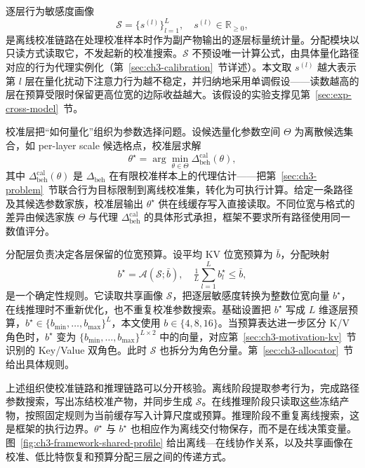 逐层行为敏感度画像
\begin{equation}
\mathcal{S}=\{s^{(l)}\}_{l=1}^{L},\quad s^{(l)}\in\mathbb{R}_{\geq 0},
\end{equation}
是离线校准链路在处理校准样本时作为副产物输出的逐层标量统计量。分配模块以只读方式读取它，不发起新的校准搜索。$\mathcal{S}$ 不预设唯一计算公式，由具体量化路径对应的行为代理实例化（第~\ref{sec:ch3-calibration}~节详述）。本文取 $s^{(l)}$ 越大表示第 $l$ 层在量化扰动下注意力行为越不稳定，并归纳地采用单调假设——读数越高的层在预算受限时保留更高位宽的边际收益越大。该假设的实验支撑见第~\ref{sec:exp-cross-model}~节。

校准层把“如何量化”组织为参数选择问题。设候选量化参数空间 $\Theta$ 为离散候选集合，如 per-layer scale 候选格点，校准层求解
\begin{equation}
\theta^\star = \arg\min_{\theta\in\Theta}\Delta_{\mathrm{beh}}^{\mathrm{cal}}(\theta),
\end{equation}
其中 $\Delta_{\mathrm{beh}}^{\mathrm{cal}}(\theta)$ 是 $\Delta_{\mathrm{beh}}$ 在有限校准样本上的代理估计——把第~\ref{sec:ch3-problem}~节联合行为目标限制到离线校准集，转化为可执行计算。给定一条路径及其候选参数家族，校准层输出 $\theta^\star$ 供在线缓存写入直接读取。不同位宽与格式的差异由候选家族 $\Theta$ 与代理 $\Delta_{\mathrm{beh}}^{\mathrm{cal}}$ 的具体形式承担，框架不要求所有路径使用同一数值评分。

分配层负责决定各层保留的位宽预算。设平均 KV 位宽预算为 $\bar b$，分配映射
\begin{equation}
b^\star = \mathcal{A}(\mathcal{S};\bar b),\quad \tfrac{1}{L}\sum_{l=1}^{L} b^\star_l \le \bar b,
\end{equation}
是一个确定性规则。它读取共享画像 $\mathcal{S}$，把逐层敏感度转换为整数位宽向量 $b^\star$，在线推理时不重新优化，也不重复校准参数搜索。基础设置把 $b^\star$ 写成 $L$ 维逐层预算，$b^\star\in\{b_{\min},\dots,b_{\max}\}^L$，本文使用 $b\in\{4,8,16\}$。当预算表达进一步区分 K/V 角色时，$b^\star$ 变为 $\{b_{\min},\dots,b_{\max}\}^{L\times 2}$ 中的向量，对应第~\ref{sec:ch3-motivation-kv}~节识别的 Key/Value 双角色。此时 $\mathcal{S}$ 也拆分为角色分量。第~\ref{sec:ch3-allocator}~节给出具体规则。

上述组织使校准链路和推理链路可以分开核验。离线阶段提取参考行为，完成路径参数搜索，写出冻结校准产物，并同步生成 $\mathcal{S}$。在线推理阶段只读取这些冻结产物，按照固定规则为当前缓存写入计算尺度或预算。推理阶段不重复离线搜索，这是框架的执行边界。$\theta^\star$ 与 $b^\star$ 也相应作为离线交付物保存，而不是在线决策变量。图~\ref{fig:ch3-framework-shared-profile} 给出离线—在线协作关系，以及共享画像在校准、低比特恢复和预算分配三层之间的传递方式。

